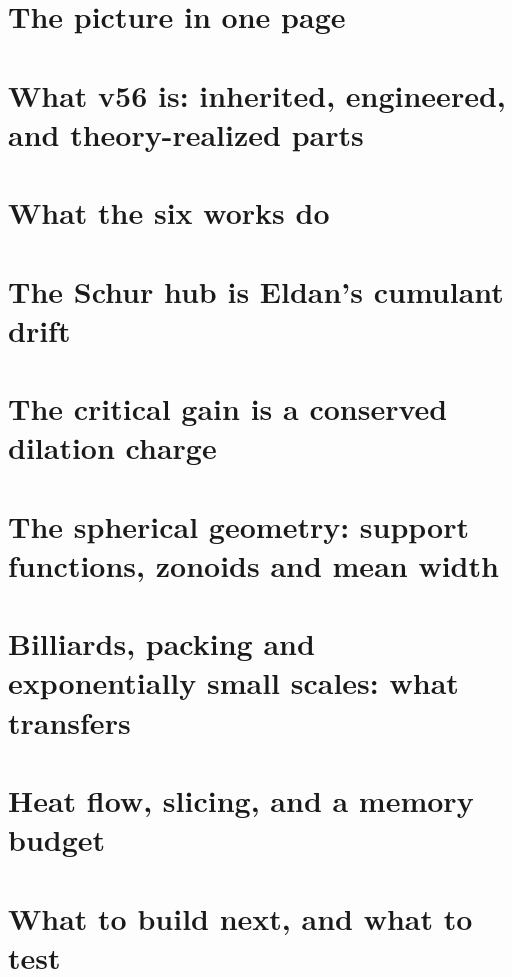 \documentclass[11pt]{article}
\theoremstyle{plain}
\theoremstyle{definition}\newtheorem{definition}[theorem]{Definition}\newtheorem{remark}[theorem]{Remark}
\begin{document}
\section{The picture in one page}

\section{What v56 is: inherited, engineered, and theory-realized parts}

\section{What the six works do}

\section{The Schur hub is Eldan's cumulant drift}

\section{The critical gain is a conserved dilation charge}

\section{The spherical geometry: support functions, zonoids and mean width}

\section{Billiards, packing and exponentially small scales: what transfers}

\section{Heat flow, slicing, and a memory budget}

\section{What to build next, and what to test}

\end{document}
